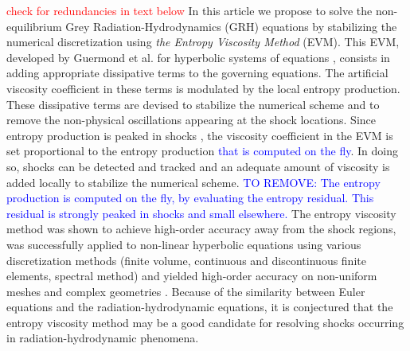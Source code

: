 \documentclass[review]{elsarticle}
\newcommand{\tcr}[1]{\textcolor{red}{#1}}
\newcommand{\tcb}[1]{\textcolor{blue}{#1}}
\begin{document}
\tcr{check for redundancies in text below}
In this article we propose to solve the non-equilibrium Grey Radiation-Hydrodynamics (GRH) equations by stabilizing the numerical discretization using \emph{the Entropy Viscosity Method} (EVM). This EVM, developed by Guermond et al. for hyperbolic systems of equations \cite{jlg1, jlg2}, consists in adding appropriate dissipative terms to the governing equations.  The artificial viscosity coefficient in these terms is modulated by the local entropy production. These dissipative terms are devised to stabilize the numerical scheme and to remove the non-physical oscillations appearing at the shock locations. Since entropy production is peaked in shocks \cite{Toro}, the  viscosity coefficient in the EVM is set proportional to the entropy production \tcb{that is computed on the fly}. In doing so, shocks can be detected and tracked and an adequate amount of viscosity is added locally to stabilize the numerical scheme. \tcb{TO REMOVE: The entropy production is computed on the fly, by evaluating the entropy residual. This residual is strongly peaked in shocks and small elsewhere.} 
The entropy viscosity method was shown to achieve high-order accuracy away from the shock regions, was successfully applied to non-linear hyperbolic equations using various discretization methods (finite volume, continuous and discontinuous finite elements, spectral method) and yielded high-order accuracy on non-uniform meshes and complex geometries \cite{jlg2, valentin}. Because of the similarity between Euler equations and the radiation-hydrodynamic equations, it is conjectured that the entropy viscosity method may be a good candidate for resolving shocks occurring in radiation-hydrodynamic phenomena.
\end{document}
